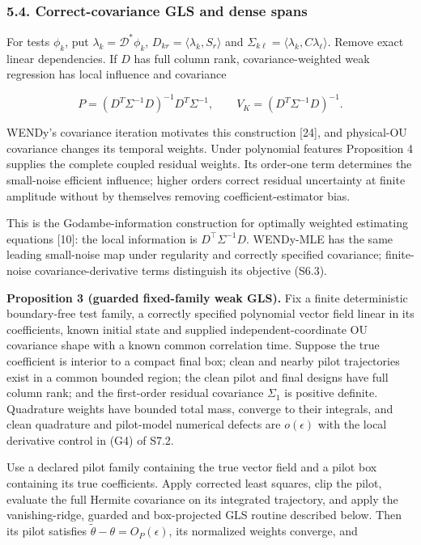 \documentclass[
  american,
  11pt,
]{article}
\begin{document}
\subsubsection{5.4. Correct-covariance GLS and dense
spans}\label{correct-covariance-gls-and-dense-spans}

For tests \(\phi_k\), put \(\lambda_k=\mathcal D^*\phi_k\),
\(D_{kr}=\langle\lambda_k,S_r\rangle\) and
\(\Sigma_{k\ell}=\langle\lambda_k,C\lambda_\ell\rangle\). Remove exact
linear dependencies. If \(D\) has full column rank, covariance-weighted
weak regression has local influence and covariance

\[
P=(D^T\Sigma^{-1}D)^{-1}D^T\Sigma^{-1},\qquad
V_K=(D^T\Sigma^{-1}D)^{-1}.
\]

WENDy's covariance iteration motivates this construction {[}24{]}, and
physical-OU covariance changes its temporal weights. Under polynomial
features Proposition 4 supplies the complete coupled residual weights.
Its order-one term determines the small-noise efficient influence;
higher orders correct residual uncertainty at finite amplitude without
by themselves removing coefficient-estimator bias.

This is the Godambe-information construction for optimally weighted
estimating equations {[}10{]}: the local information is
\(D^\top\Sigma^{-1}D\). WENDy-MLE has the same leading small-noise map
under regularity and correctly specified covariance; finite-noise
covariance-derivative terms distinguish its objective (S6.3).

\textbf{Proposition 3 (guarded fixed-family weak GLS).} Fix a finite
deterministic boundary-free test family, a correctly specified
polynomial vector field linear in its coefficients, known initial state
and supplied independent-coordinate OU covariance shape with a known
common correlation time. Suppose the true coefficient is interior to a
compact final box; clean and nearby pilot trajectories exist in a common
bounded region; the clean pilot and final designs have full column rank;
and the first-order residual covariance \(\Sigma_1\) is positive
definite. Quadrature weights have bounded total mass, converge to their
integrals, and clean quadrature and pilot-model numerical defects are
\(o(\epsilon)\) with the local derivative control in (G4) of S7.2.

Use a declared pilot family containing the true vector field and a pilot
box containing its true coefficients. Apply corrected least squares,
clip the pilot, evaluate the full Hermite covariance on its integrated
trajectory, and apply the vanishing-ridge, guarded and box-projected GLS
routine described below. Then its pilot satisfies
\(\widetilde\theta-\theta=O_P(\epsilon)\), its normalized weights
converge, and
\end{document}
